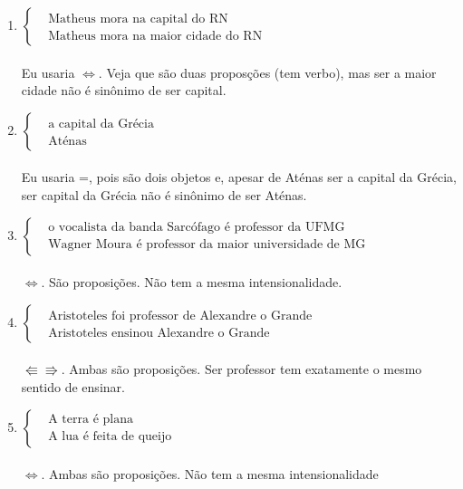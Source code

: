 \documentclass[a4paper, 12pt]{article}
\begin{document}
\begin{enumerate}
    \item $\left\{
    \begin{aligned}
    &\textrm{Matheus mora na capital do RN}\\
    &\textrm{Matheus mora na maior cidade do RN}
    \end{aligned}
    \right.$ \\ \\
    Eu usaria $\iff$. Veja que são duas proposções (tem verbo), mas ser a maior cidade não é sinônimo de ser capital. \\

    \item $\left\{
    \begin{aligned}
    &\textrm{a capital da Grécia}\\
    &\textrm{Aténas}
    \end{aligned}
    \right.$ \\ \\
    Eu usaria =, pois são dois objetos e, apesar de Aténas ser a capital da Grécia, ser capital da Grécia não é sinônimo de ser Aténas. \\

    \item $\left\{
    \begin{aligned}
    &\textrm{o vocalista da banda Sarcófago é professor da UFMG}\\
    &\textrm{Wagner Moura é professor da maior universidade de MG}
    \end{aligned}
    \right.$ \\ \\
    $\iff$. São proposições. Não tem a mesma intensionalidade. \\

    \item $\left\{
    \begin{aligned}
    &\textrm{Aristoteles foi professor de Alexandre o Grande
    }\\
    &\textrm{Aristoteles ensinou Alexandre o Grande}
    \end{aligned}
    \right.$ \\ \\
    $\Lleftarrow\Rrightarrow$. Ambas são proposições. Ser professor tem exatamente o mesmo sentido de ensinar. \\

    \item $\left\{
    \begin{aligned}
    &\textrm{A terra é plana}\\
    &\textrm{A lua é feita de queijo}
    \end{aligned}
    \right.$ \\ \\
    $\iff$. Ambas são proposições. Não tem a mesma intensionalidade \\
    

\end{enumerate}
\end{document}
